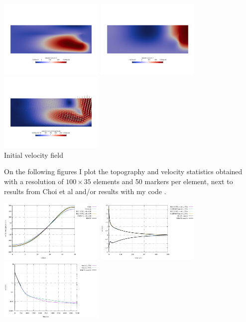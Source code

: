 \begin{center}
\includegraphics[width=5cm]{python_codes/fieldstone_64/results/flexureplate/u.png}
\includegraphics[width=5cm]{python_codes/fieldstone_64/results/flexureplate/v.png}
\includegraphics[width=5cm]{python_codes/fieldstone_64/results/flexureplate/vel.png}\\
{\captionfont Initial velocity field}
\end{center}

On the following figures I plot the topography and velocity statistics obtained with 
a resolution of $100\times35$ elements and 50 markers per element, next to 
results from Choi et al and/or results with my code \elefant \cite{thie14}.  
\begin{center}
\includegraphics[width=5cm]{python_codes/fieldstone_64/results/flexureplate/topo.pdf}
\includegraphics[width=5cm]{python_codes/fieldstone_64/results/flexureplate/v.pdf}
\includegraphics[width=5cm]{python_codes/fieldstone_64/results/flexureplate/v_log.pdf}
\end{center}

